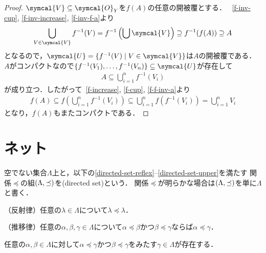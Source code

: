 \documentclass{ltjsbook}
\begin{document}
\begin{proof}
\(\symcal{V} \subseteq \symcal{O}_Y\)を\(f(A)\)の任意の開被覆とする．
~\ref{f-inv-cup}, \ref{f-inv-increase}, \ref{f-inv-f-a}より
\begin{align*}
    \bigcup_{V \in \symcal{V}} f^{-1}(V)
    = f^{-1} \left(\bigcup  \symcal{V}\right)
    \supseteq f^{-1}(f(A))
    \supseteq A
\end{align*}
となるので，\(\symcal{U} = \{f^{-1}(V) \mid V \in \symcal{V}\}\)は\(A\)の開被覆である．
\(A\)がコンパクトなので\(\{f^{-1}(V_1), \ldots, f^{-1}(V_n)\} \subseteq \symcal{U}\)が存在して
\begin{align*}
    A \subseteq \bigcup_{i = 1}^n f^{-1}(V_i)
\end{align*}
が成り立つ．したがって~\ref{f-increase}, \ref{f-cup}, \ref{f-f-inv-a}より
\begin{align*}
    f(A)
    \subseteq f \left(\bigcup_{i = 1}^n f^{-1}(V_i)\right)
    \subseteq \bigcup_{i = 1}^n f (f^{-1}(V_i))
    = \bigcup_{i = 1}^n V_i
\end{align*}
となり，\(f(A)\)もまたコンパクトである．
\end{proof}

\section{ネット}
\begin{thmbox}
\begin{definition}
空でない集合\(\Lambda\)上と，以下の\ref{directed-set-reflex}--\ref{directed-set-upper}を満たす
関係\(\preceq\)の組\((\Lambda, \preceq)\)を(directed set)という．
関係\(\preceq\)が明らかな場合は\((\Lambda, \preceq)\)を単に\(\Lambda\)と書く．
\begin{conditions}
    \item\label{directed-set-reflex} （反射律）任意の\(\lambda \in \Lambda\)について\(\lambda \preceq \lambda\)．
    \item\label{directed-set-trans} （推移律）任意の\(\alpha, \beta, \gamma \in \Lambda\)について\(\alpha \preceq \beta\)かつ\(\beta \preceq \gamma\)ならば\(\alpha \preceq \gamma\)．
    \item\label{directed-set-upper} 任意の\(\alpha, \beta \in \Lambda\)に対して\(\alpha \preceq \gamma\)かつ\(\beta \preceq \gamma\)をみたす\(\gamma \in \Lambda\)が存在する．
\end{conditions}
\end{definition}
\end{thmbox}
\end{document}
